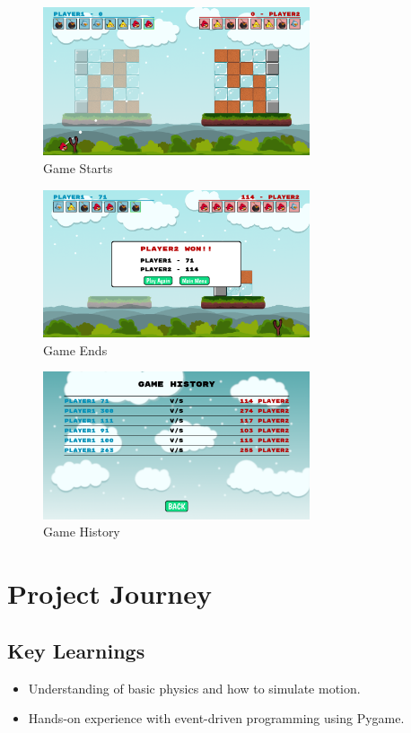 \documentclass[12pt]{article}
\begin{document}
\begin{figure}[h!]
    \centering
    \includegraphics[width=0.7\textwidth]{ScreenShots/GameStarts.png}
    \caption{Game Starts}
\end{figure}

\begin{figure}[h!]
    \centering
    \includegraphics[width=0.7\textwidth]{ScreenShots/GameEnds.png}
    \caption{Game Ends}
\end{figure}

\begin{figure}[h!]
    \centering
    \includegraphics[width=0.7\textwidth]{ScreenShots/GameHistory.png}
    \caption{Game History}
\end{figure}

\newpage

\section{Project Journey}
\subsection{Key Learnings}
\begin{itemize}
    \item Understanding of basic physics and how to simulate motion.
    \item Hands-on experience with event-driven programming using Pygame.
\end{itemize}
\end{document}
